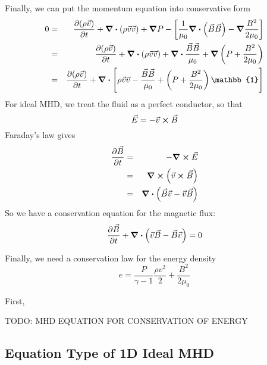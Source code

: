 \documentclass[10pt,letterpaper,notitlepage]{report}
\begin{document}
Finally, we can put the momentum equation into conservative form
\begin{eqnarray}
0 & = & \pdv{(\rho \vec v)}{t} + \div (\rho \vec v \vec v) + \grad P - \left[\frac{1}{\mu_0} \div (\vec B \vec B) - \grad \frac{B^2}{2 \mu_0} \right] \\
& = & \pdv{(\rho \vec v)}{t} + \div (\rho \vec v \vec v) + \div \frac{\vec B \vec B}{\mu_0} + \grad \left( P + \frac{B^2}{2 \mu_0} \right) \\
& = & \pdv{(\rho \vec v)}{t} + \div \left[ \rho \vec v \vec v - \frac{\vec B \vec B}{\mu_0} + \left( P + \frac{B^2}{2\mu_0} \right) \mathbb{1} \right]
\end{eqnarray}
For ideal MHD, we treat the fluid as a perfect conductor, so that
\begin{equation}
\vec E = - \vec v \cross \vec B
\end{equation}
Faraday's law gives
\begin{eqnarray}
\pdv{\vec B}{t} & = &  - \curl \vec E\\
& = & \curl (\vec v \cross \vec B) \\
& = & \div ( \vec B \vec v - \vec v \vec B)
\end{eqnarray}
So we have a conservation equation for the magnetic flux:
\begin{equation}
\pdv{\vec B}{t} + \div (\vec v \vec B - \vec B \vec v) = 0
\end{equation}

Finally, we need a conservation law for the energy density
\begin{equation}
e = \frac{P}{\gamma - 1} \frac{\rho v^2}{2} + \frac{B^2}{2 \mu_0}
\end{equation}

First, 


TODO: MHD EQUATION FOR CONSERVATION OF ENERGY

\subsection*{Equation Type of 1D Ideal MHD}
\end{document}
